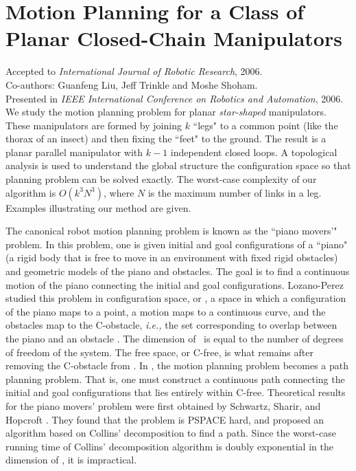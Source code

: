 \chapter{Motion Planning for a Class of Planar Closed-Chain Manipulators}
\label{chap2}

\textsf{Accepted to \textsl{International Journal of Robotic Research}, 2006.} \\
\textsf{Co-authors: Guanfeng Liu, Jeff Trinkle and Moshe
Shoham.}\\
\textsf{Presented in \textsl{IEEE International
Conference on Robotics and Automation}, 2006.} \\

We study the motion planning problem for planar {\sl star-shaped}
manipulators. These manipulators are formed by joining $k$ ``legs"
to a common point (like the thorax of an insect) and then fixing
the ``feet" to the ground.  The result is a planar parallel
manipulator with $k-1$ independent closed loops.  A topological
analysis is used to understand the global structure the
configuration space so that planning problem can be solved
exactly. The worst-case complexity of our algorithm is
$O(k^3N^3)$, where $N$ is the maximum number of links in a leg.
Examples illustrating our method are given.

 The canonical robot motion planning problem is
known as the ``piano movers'" problem.  In this problem, one is
given initial and goal configurations of a ``piano" (a rigid body
that is free to move in an environment with fixed rigid obstacles)
and geometric models of the piano and obstacles.  The goal is to
find a continuous motion of the piano connecting the initial and
goal configurations. Lozano-Perez studied this problem in
configuration space, or \cspace, a space in which a configuration
of the piano maps to a point, a motion maps to a continuous curve,
and the obstacles map to the C-obstacle, {\em i.e.,} the set
corresponding to overlap between the piano and an obstacle
\cite{Lozano-Perez83}.  The dimension of \cspace \ is equal to the
number of degrees of freedom of the system. The free space, or
C-free, is what remains after removing the C-obstacle from
\cspace. In \cspace, the motion planning problem becomes a path
planning problem. That is, one must construct a continuous path
connecting the initial and goal configurations that lies entirely
within C-free. Theoretical results for the piano movers' problem
were first obtained by Schwartz, Sharir, and Hopcroft
\cite{SS83,SHS87}. They found that the problem is PSPACE hard, and
proposed an algorithm based on Collins' decomposition to find a
path. Since the worst-case running time of Collins' decomposition
algorithm is doubly exponential in the dimension of \cspace, it is
impractical.

